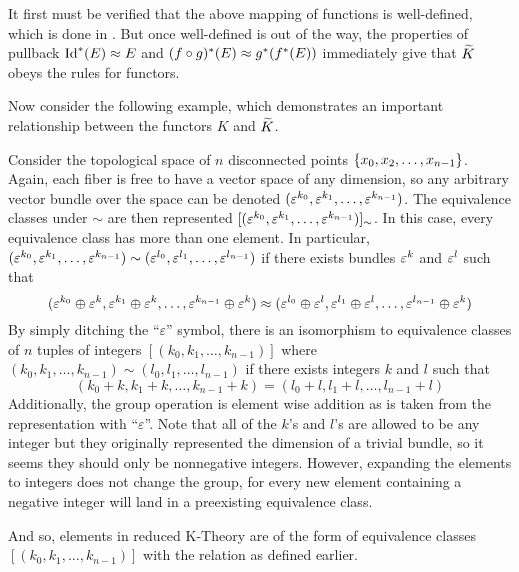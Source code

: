 \documentclass[../sean_thesis.tex]{subfiles}
\begin{document}

It first must be verified that the above mapping of functions is well-defined, which is done in . But once well-defined is out of the way, the properties of pullback $\operatorname{Id}^{*}(E) \approx E$ and $(f\circ g)^{*}(E) \approx g^{*}(f^{*}(E))$ immediately give that $\widetilde{K}$ obeys the rules for functors.

Now consider the following example, which demonstrates an important relationship between the functors $K$ and $\widetilde{K}$.
\begin{example}
	Consider the topological space of $n$ disconnected points $\left\{x_0, x_2, \dots, x_{n-1}\right\}$. Again, each fiber is free to have a vector space of any dimension, so any arbitrary vector bundle over the space can be denoted $(\varepsilon^{k_0}, \varepsilon^{k_1}, \dots, \varepsilon^{k_{n-1}})$. The equivalence classes under $\sim$ are then represented $[(\varepsilon^{k_0}, \varepsilon^{k_1}, \dots, \varepsilon^{k_{n-1}})]_{\sim}$. In this case, every equivalence class has more than one element. In particular, $(\varepsilon^{k_0}, \varepsilon^{k_1}, \dots, \varepsilon^{k_{n-1}}) \sim (\varepsilon^{l_0}, \varepsilon^{l_1}, \dots, \varepsilon^{l_{n-1}})$ if there exists bundles $\varepsilon^{k}$ and $\varepsilon^{l}$ such that 
	\begin{equation*}
		(\varepsilon^{k_0} \oplus \varepsilon^{k}, \varepsilon^{k_1} \oplus \varepsilon^{k}, \dots, \varepsilon^{k_{n-1}} \oplus \varepsilon^{k})
		\approx
		(\varepsilon^{l_0} \oplus \varepsilon^{l}, \varepsilon^{l_1} \oplus \varepsilon^{l}, \dots, \varepsilon^{l_{n-1}} \oplus \varepsilon^{k})
	\end{equation*}
By simply ditching the ``$\varepsilon$'' symbol, there is an isomorphism to equivalence classes of $n$ tuples of integers $[(k_0, k_1, \dots, k_{n-1})]$ where $(k_0, k_1, \dots, k_{n-1}) \sim (l_0, l_1, \dots, l_{n-1})$ if there exists integers $k$ and $l$ such that
\begin{equation*}
	(k_0 + k, k_1 + k, \dots, k_{n-1} + k) = (l_0 + l, l_1 + l, \dots, l_{n-1} + l)
\end{equation*}
Additionally, the group operation is element wise addition as is taken from the representation with ``$\varepsilon$''. Note that all of the $k$'s and $l$'s are allowed to be any integer but they originally represented the dimension of a trivial bundle, so it seems they should only be nonnegative integers. However, expanding the elements to integers does not change the group, for every new element containing a negative integer will land in a preexisting equivalence class.

And so, elements in reduced K-Theory are of the form of equivalence classes $[(k_0, k_1, \dots, k_{n-1})]$ with the  relation as defined earlier.


\end{example}
\end{document}
